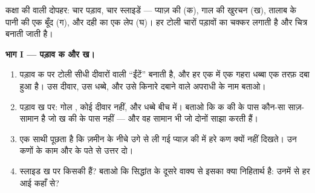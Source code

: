 \begin{problem}[{सप्ताहांत समस्या --- चार स्लाइडें, एक
सिद्धांत}]\label{pb:g6:cell-unit-of-life:1}
कक्षा की  वाली दोपहर: चार पड़ाव, चार स्लाइडें --- प्याज़ की
 (क), गाल की खुरचन (ख), तालाब के पानी की एक बूँद (ग), और दही का
एक लेप (घ)। हर टोली चारों पड़ावों का चक्कर लगाती है और चित्र बनाती
जाती है।

\medskip\noindent\textbf{भाग I --- पड़ाव क और ख।}
\begin{enumerate}
  \item पड़ाव क पर टोली सीधी दीवारों वाली ``ईंटें'' बनाती है, और हर एक
        में एक गहरा धब्बा एक तरफ़ दबा हुआ है। उस दीवार, उस धब्बे, और
        उसे किनारे दबाने वाले अपराधी के नाम बताओ।
  \item पड़ाव ख पर: गोल , कोई दीवार नहीं, और धब्बे बीच में।
        बताओ कि क की  के पास कौन-सा साज़-सामान है जो ख की
         के पास नहीं --- और वह सामान भी जो दोनों साझा करती
        हैं।
  \item एक साथी पूछता है कि ज़मीन के नीचे उगे  से ली गई प्याज़ की
         में हरे कण क्यों नहीं दिखते। उन कणों के काम और
         के पते से उत्तर दो।
  \item स्लाइड ख पर किसकी  हैं? बताओ कि  सिद्धांत के
        दूसरे वाक्य से इसका क्या निहितार्थ है: उनमें से हर  आई
        कहाँ से?
\end{enumerate}


\end{problem}
